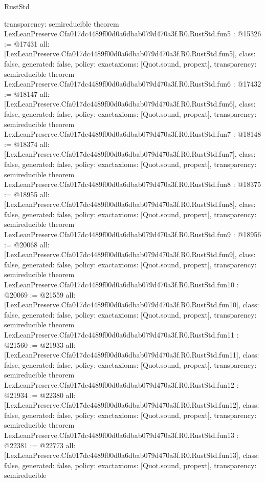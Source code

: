 \begin{lexlean}{RustStd}
\begin{coremodule}
{  transparency: semireducible
}
theorem LexLeanPreserve.Cfa017dc4489f00d0a6dbab079d470a3f.R0.RustStd.fun5 : @15326 := @17431 {
  all: [LexLeanPreserve.Cfa017dc4489f00d0a6dbab079d470a3f.R0.RustStd.fun5],
  class: false,
  generated: false,
  policy: exact{axioms: [Quot.sound, propext]},
  transparency: semireducible
}
theorem LexLeanPreserve.Cfa017dc4489f00d0a6dbab079d470a3f.R0.RustStd.fun6 : @17432 := @18147 {
  all: [LexLeanPreserve.Cfa017dc4489f00d0a6dbab079d470a3f.R0.RustStd.fun6],
  class: false,
  generated: false,
  policy: exact{axioms: [Quot.sound, propext]},
  transparency: semireducible
}
theorem LexLeanPreserve.Cfa017dc4489f00d0a6dbab079d470a3f.R0.RustStd.fun7 : @18148 := @18374 {
  all: [LexLeanPreserve.Cfa017dc4489f00d0a6dbab079d470a3f.R0.RustStd.fun7],
  class: false,
  generated: false,
  policy: exact{axioms: [Quot.sound, propext]},
  transparency: semireducible
}
theorem LexLeanPreserve.Cfa017dc4489f00d0a6dbab079d470a3f.R0.RustStd.fun8 : @18375 := @18955 {
  all: [LexLeanPreserve.Cfa017dc4489f00d0a6dbab079d470a3f.R0.RustStd.fun8],
  class: false,
  generated: false,
  policy: exact{axioms: [Quot.sound, propext]},
  transparency: semireducible
}
theorem LexLeanPreserve.Cfa017dc4489f00d0a6dbab079d470a3f.R0.RustStd.fun9 : @18956 := @20068 {
  all: [LexLeanPreserve.Cfa017dc4489f00d0a6dbab079d470a3f.R0.RustStd.fun9],
  class: false,
  generated: false,
  policy: exact{axioms: [Quot.sound, propext]},
  transparency: semireducible
}
theorem LexLeanPreserve.Cfa017dc4489f00d0a6dbab079d470a3f.R0.RustStd.fun10 : @20069 := @21559 {
  all: [LexLeanPreserve.Cfa017dc4489f00d0a6dbab079d470a3f.R0.RustStd.fun10],
  class: false,
  generated: false,
  policy: exact{axioms: [Quot.sound, propext]},
  transparency: semireducible
}
theorem LexLeanPreserve.Cfa017dc4489f00d0a6dbab079d470a3f.R0.RustStd.fun11 : @21560 := @21933 {
  all: [LexLeanPreserve.Cfa017dc4489f00d0a6dbab079d470a3f.R0.RustStd.fun11],
  class: false,
  generated: false,
  policy: exact{axioms: [Quot.sound, propext]},
  transparency: semireducible
}
theorem LexLeanPreserve.Cfa017dc4489f00d0a6dbab079d470a3f.R0.RustStd.fun12 : @21934 := @22380 {
  all: [LexLeanPreserve.Cfa017dc4489f00d0a6dbab079d470a3f.R0.RustStd.fun12],
  class: false,
  generated: false,
  policy: exact{axioms: [Quot.sound, propext]},
  transparency: semireducible
}
theorem LexLeanPreserve.Cfa017dc4489f00d0a6dbab079d470a3f.R0.RustStd.fun13 : @22381 := @22773 {
  all: [LexLeanPreserve.Cfa017dc4489f00d0a6dbab079d470a3f.R0.RustStd.fun13],
  class: false,
  generated: false,
  policy: exact{axioms: [Quot.sound, propext]},
  transparency: semireducible
}
\end{coremodule}
\end{lexlean}
